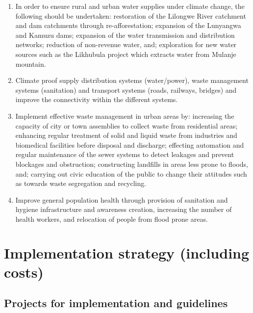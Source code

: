 \documentclass[
]{book}
\begin{document}
\begin{enumerate}
\item
  In order to ensure rural and urban water supplies under climate change, the following should be undertaken: restoration of the Lilongwe River catchment and dam catchments through re-afforestation; expansion of the Lunyangwa and Kamuzu dams; expansion of the water transmission and distribution networks; reduction of non-revenue water, and; exploration for new water sources such as the Likhubula project which extracts water from Mulanje mountain.
\item
  Climate proof supply distribution systems (water/power), waste management systems (sanitation) and transport systems (roads, railways, bridges) and improve the connectivity within the different systems.
\item
  Implement effective waste management in urban areas by: increasing the capacity of city or town assemblies to collect waste from residential areas; enhancing regular treatment of solid and liquid waste from industries and biomedical facilities before disposal and discharge; effecting automation and regular maintenance of the sewer systems to detect leakages and prevent blockages and obstruction; constructing landfills in areas less prone to floods, and; carrying out civic education of the public to change their attitudes such as towards waste segregation and recycling.
\item
  Improve general population health through provision of sanitation and hygiene infrastructure and awareness creation, increasing the number of health workers, and relocation of people from flood prone areas.
\end{enumerate}

\hypertarget{implementation-strategy-including-costs}{%
\chapter{Implementation strategy (including costs)}\label{implementation-strategy-including-costs}}

\hypertarget{projects-for-implementation-and-guidelines}{%
\section{Projects for implementation and guidelines}\label{projects-for-implementation-and-guidelines}}

\providecommand{\docline}[3]{\noalign{\global\setlength{\arrayrulewidth}{#1}}\arrayrulecolor[HTML]{#2}\cline{#3}}
\end{document}
